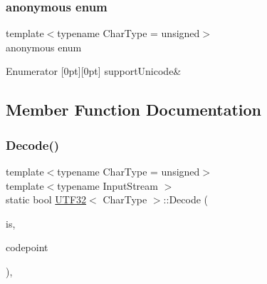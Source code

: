 \subsubsection{\texorpdfstring{anonymous enum}{anonymous enum}}
{\footnotesize\ttfamily template$<$typename Char\+Type  = unsigned$>$ \\
anonymous enum}

\begin{DoxyEnumFields}{Enumerator}
[0pt][0pt]{}\mbox{\label{structUTF32_ab0e36a7527093764bfa9f0a504187fc3ae44852fd9d88deed3a956b89108412a5}} 
support\+Unicode&\\
\hline

\end{DoxyEnumFields}


\subsection{Member Function Documentation}
\mbox{\label{structUTF32_a6e7258a5e982e101345dffdc355e9b53}} 
\subsubsection{\texorpdfstring{Decode()}{Decode()}}
{\footnotesize\ttfamily template$<$typename Char\+Type  = unsigned$>$ \\
template$<$typename Input\+Stream $>$ \\
static bool \hyperlink{structUTF32}{U\+T\+F32}$<$ Char\+Type $>$\+::Decode (\begin{DoxyParamCaption}\item[{Input\+Stream \&}]{is,  }\item[{unsigned $\ast$}]{codepoint }\end{DoxyParamCaption})\hspace{0.3cm}{\ttfamily [inline]}, {\ttfamily [static]}}

\mbox{\label{structUTF32_a511d1b09672ce535085895a28d8c2f13}} 
